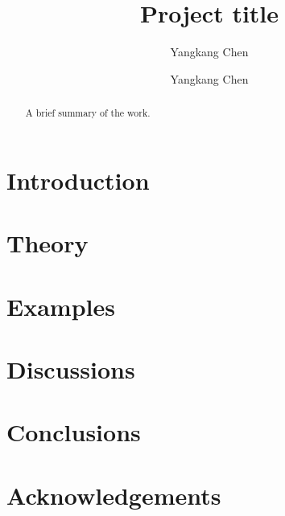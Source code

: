 

\title{Project title}
\author{Yangkang Chen}

\renewcommand{\thefootnote}{\fnsymbol{footnote}}

\author{Yangkang Chen\footnotemark[1]}


\address{
\footnotemark[1]
School of Earth Sciences\\
Zhejiang University\\
Hangzhou, Zhejiang Province, China, 310027\\
yangkang.chen@zju.edu.cn 
}


\begin{abstract}
A brief summary of the work.
\end{abstract}


\section{Introduction}
\section{Theory}
\section{Examples}
\section{Discussions}
\section{Conclusions}
\section{Acknowledgements}





